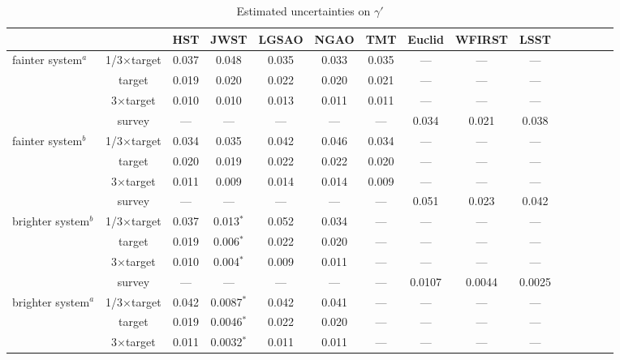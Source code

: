 \documentclass[a4paper,11pt]{article}
\begin{document}
\begin{table}\footnotesize
\begin{center}
\caption{Estimated uncertainties on $\gamma'$}
\begin{tabular}{lcccccccccccccc|}
\hline \hline
& & HST & JWST & LGSAO & NGAO & TMT & Euclid & WFIRST & LSST \\
\hline
fainter system$^a$ & 1/3$\times$target  & 0.037 & 0.048 & 0.035 & 0.033 & 0.035 & --- & --- & ---\\
&                        target  & 0.019 & 0.020 & 0.022 & 0.020 & 0.021 & --- & --- & ---\\
&                      3$\times$target  & 0.010 & 0.010 & 0.013 & 0.011 & 0.011 & --- & --- & ---\\
&                       survey  & ---      & ---       & ---      & ---      & ---      & 0.034 & 0.021 & 0.038 \\
\hline
fainter system$^b$ & 1/3$\times$target & 0.034 & 0.035 & 0.042 & 0.046 & 0.034 & --- & --- & ---\\
&                         target & 0.020 & 0.019 & 0.022 & 0.022 & 0.020 & --- & --- & ---\\
&                       3$\times$target & 0.011 & 0.009 & 0.014 & 0.014 & 0.009 & --- & --- & ---\\
&                        survey & ---      & ---      & ---       & ---       & ---      & 0.051 & 0.023 & 0.042\\
\hline
brighter system$^b$ & 1/3$\times$target & 0.037 & 0.013$^*$ & 0.052 & 0.034 & --- & --- & --- & ---\\
&                                       target & 0.019 & 0.006$^*$ & 0.022 & 0.020 & --- & --- & --- & ---\\
&                                      3$\times$target & 0.010 & 0.004$^*$ & 0.009 & 0.011 & --- & --- & --- & ---\\
&                                        survey & ---     & ---             & ---       & ---      & --- & 0.0107 & 0.0044 & 0.0025\\
\hline
brighter system$^a$ & 1/3$\times$target & 0.042 & 0.0087$^*$ & 0.042 & 0.041 & --- & --- & --- & ---\\
&                                       target & 0.019 & 0.0046$^*$ & 0.022 & 0.020 & --- & --- & --- & ---\\
&                                      3$\times$target & 0.011 & 0.0032$^*$ & 0.011 & 0.011 & --- & --- & --- & ---\\

\end{tabular}
\end{center}
\end{table}
\end{document}

